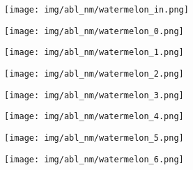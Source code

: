 \documentclass[10pt,twocolumn,letterpaper]{article}
\begin{document}
\newcommand{\nmwidth}{0.11} 
\begin{figure}[tbp]
\captionsetup[subfigure]{labelformat=empty}
\begin{center}
  \begin{subfigure}[b]{\nmwidth\linewidth}
  \texttt{[image: img/abl\_nm/watermelon\_in.png]}
  \end{subfigure}
  \begin{subfigure}[b]{\nmwidth\linewidth}
  \texttt{[image: img/abl\_nm/watermelon\_0.png]}
  \end{subfigure}
\begin{subfigure}[b]{\nmwidth\linewidth}
  \texttt{[image: img/abl\_nm/watermelon\_1.png]}
  \end{subfigure}
  \begin{subfigure}[b]{\nmwidth\linewidth}
  \texttt{[image: img/abl\_nm/watermelon\_2.png]}
  \end{subfigure}
  \begin{subfigure}[b]{\nmwidth\linewidth}
  \texttt{[image: img/abl\_nm/watermelon\_3.png]}
  \end{subfigure}
  \begin{subfigure}[b]{\nmwidth\linewidth}
  \texttt{[image: img/abl\_nm/watermelon\_4.png]}
  \end{subfigure}
\begin{subfigure}[b]{\nmwidth\linewidth}
  \texttt{[image: img/abl\_nm/watermelon\_5.png]}
  \end{subfigure}
  \begin{subfigure}[b]{\nmwidth\linewidth}
  \texttt{[image: img/abl\_nm/watermelon\_6.png]}
  \end{subfigure}
  

\end{center}
\end{figure}
\end{document}
